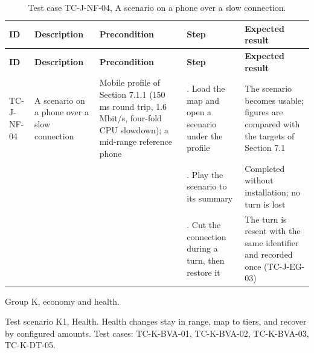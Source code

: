 {\small
\begin{longtable}{|>{\raggedright\arraybackslash}p{}|>{\raggedright\arraybackslash}p{}|>{\raggedright\arraybackslash}p{}|>{\raggedright\arraybackslash}p{}|>{\raggedright\arraybackslash}p{}|}
\caption{Test case TC-J-NF-04, A scenario on a phone over a slow connection.} \\
\hline
\textbf{ID} & \textbf{Description} & \textbf{Precondition} & \textbf{Step} & \textbf{Expected result} \\ \hline
\endfirsthead
\hline
\textbf{ID} & \textbf{Description} & \textbf{Precondition} & \textbf{Step} & \textbf{Expected result} \\ \hline
\endhead
TC-J-NF-04 & A scenario on a phone over a slow connection & Mobile profile of Section 7.1.1 (150 ms round trip, 1.6 Mbit/s, four-fold CPU slowdown); a mid-range reference phone & 1. Load the map and open a scenario under the profile & The scenario becomes usable; figures are compared with the targets of Section 7.1 \\ \hline
 &  &  & 2. Play the scenario to its summary & Completed without installation; no turn is lost \\ \hline
 &  &  & 3. Cut the connection during a turn, then restore it & The turn is resent with the same identifier and recorded once (TC-J-EG-03) \\ \hline
\end{longtable}
}

Group K, economy and health.

Test scenario K1, Health. Health changes stay in range, map to tiers, and recover by configured amounts. Test cases: TC-K-BVA-01, TC-K-BVA-02, TC-K-BVA-03, TC-K-DT-05.

